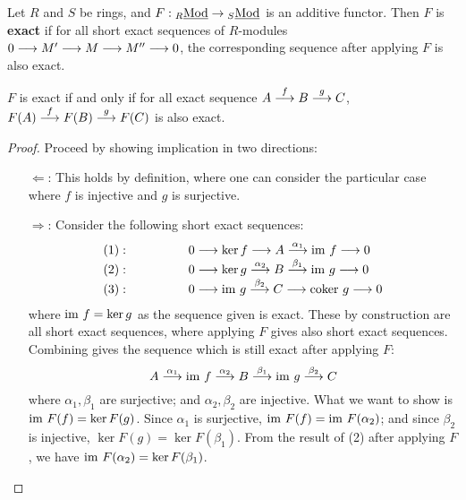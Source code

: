 
\begin{definition}
    Let $R$ and $S$ be rings, and $F: {}_{R}\underline{\textup{Mod}} \to {}_{S}\underline{\textup{Mod}}$ is an additive functor. Then $F$ is \textbf{exact} if for all short exact sequences of $R$-modules $0 \longrightarrow M' \longrightarrow M \longrightarrow M'' \longrightarrow 0$, the corresponding sequence after applying $F$ is also exact.
\end{definition}

\begin{proposition}
    $F$ is exact if and only if for all exact sequence $A \overset{f}{\longrightarrow} B \overset{g}{\longrightarrow} C$, $F(A) \overset{f}{\longrightarrow} F(B) \overset{g}{\longrightarrow} F(C)$ is also exact.
\end{proposition}

\begin{proof}
    Proceed by showing implication in two directions:
    \begin{itemize}
        \item[$\Leftarrow$:] This holds by definition, where one can consider the particular case where $f$ is injective and $g$ is surjective.
        \item[$\Rightarrow$:] Consider the following short exact sequences:
        \[
        \begin{array}{ll}
            (1):\qquad\qquad & 0 \longrightarrow \ker f \longrightarrow A \overset{\alpha_1}{\longrightarrow} \mathrm{im}\  f \longrightarrow 0 \\
            (2):\qquad\qquad & 0 \longrightarrow \ker g \overset{\alpha_2}{\longrightarrow} B \overset{\beta_1}{\longrightarrow} \mathrm{im}\  g \longrightarrow 0 \\
            (3):\qquad\qquad & 0 \longrightarrow \mathrm{im}\  g \overset{\beta_2}{\longrightarrow} C \longrightarrow \mathrm{coker}\  g \longrightarrow 0
        \end{array}
        \]
        where $\mathrm{im}\  f = \ker g$ as the sequence given is exact. These by construction are all short exact sequences, where applying $F$ gives also short exact sequences. Combining gives the sequence which is still exact after applying $F$:
        \[
            A \overset{\alpha_1}{\longrightarrow} \mathrm{im}\  f \overset{\alpha_2}{\longrightarrow} B \overset{\beta_1}{\longrightarrow} \mathrm{im}\  g \overset{\beta_2}{\longrightarrow} C
        \]
        where $\alpha_1, \beta_1$ are surjective; and $\alpha_2, \beta_2$ are injective. What we want to show is $\mathrm{im}\  F(f) = \ker F(g)$. Since $\alpha_1$ is surjective, $\mathrm{im}\  F(f) = \mathrm{im}\  F(\alpha_2)$; and since $\beta_2$ is injective, $\ker F(g) = \ker F(\beta_1)$. From the result of (2) after applying $F$, we have $\mathrm{im}\  F(\alpha_2) = \ker F(\beta_1)$.
    \end{itemize}
\end{proof}

